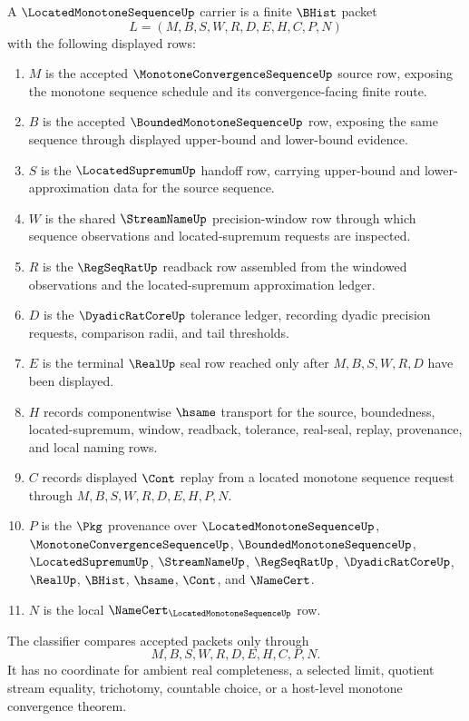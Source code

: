 \begin{definition}
\label{def:located-monotone-sequence-carrier}
A $\LocatedMonotoneSequenceUp$ carrier is a finite $\BHist$ packet
$$
L=(M,B,S,W,R,D,E,H,C,P,N)
$$
with the following displayed rows:
\begin{enumerate}
\item $M$ is the accepted $\MonotoneConvergenceSequenceUp$ source row, exposing the monotone sequence schedule and its convergence-facing finite route.
\item $B$ is the accepted $\BoundedMonotoneSequenceUp$ row, exposing the same sequence through displayed upper-bound and lower-bound evidence.
\item $S$ is the $\LocatedSupremumUp$ handoff row, carrying upper-bound and lower-approximation data for the source sequence.
\item $W$ is the shared $\StreamNameUp$ precision-window row through which sequence observations and located-supremum requests are inspected.
\item $R$ is the $\RegSeqRatUp$ readback row assembled from the windowed observations and the located-supremum approximation ledger.
\item $D$ is the $\DyadicRatCoreUp$ tolerance ledger, recording dyadic precision requests, comparison radii, and tail thresholds.
\item $E$ is the terminal $\RealUp$ seal row reached only after $M,B,S,W,R,D$ have been displayed.
\item $H$ records componentwise $\hsame$ transport for the source, boundedness, located-supremum, window, readback, tolerance, real-seal, replay, provenance, and local naming rows.
\item $C$ records displayed $\Cont$ replay from a located monotone sequence request through $M,B,S,W,R,D,E,H,P,N$.
\item $P$ is the $\Pkg$ provenance over $\LocatedMonotoneSequenceUp$, $\MonotoneConvergenceSequenceUp$, $\BoundedMonotoneSequenceUp$, $\LocatedSupremumUp$, $\StreamNameUp$, $\RegSeqRatUp$, $\DyadicRatCoreUp$, $\RealUp$, $\BHist$, $\hsame$, $\Cont$, and $\NameCert$.
\item $N$ is the local $\NameCert_{\LocatedMonotoneSequenceUp}$ row.
\end{enumerate}
The classifier compares accepted packets only through
$$
M,B,S,W,R,D,E,H,C,P,N.
$$
It has no coordinate for ambient real completeness, a selected limit, quotient stream equality, trichotomy, countable choice, or a host-level monotone convergence theorem.
\end{definition}


